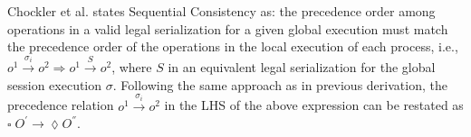 \documentclass[journal,compsoc]{IEEEtran}
\begin{document}
   \par Chockler et al. states Sequential Consistency as: the precedence order among operations  in a valid legal serialization for a given global execution must match the precedence order of the operations in the local execution of each process, i.e.,  $\mathit{o}^1 \xrightarrow{\sigma_i} \mathit{o}^2 \Rightarrow \mathit{o}^1 \xrightarrow{S} \mathit{o}^2$, where $S$ in an equivalent legal serialization for the global session execution $\sigma$.  Following the same approach as in previous derivation, %
  the precedence relation $\mathit{o}^1 \xrightarrow{\sigma_i} \mathit{o}^2$ in the LHS of the above expression can be restated as
   $ \square\;  \mathit{O}^{'} \rightarrow \lozenge  \mathit{O}^{''}$.  %
\end{document}
